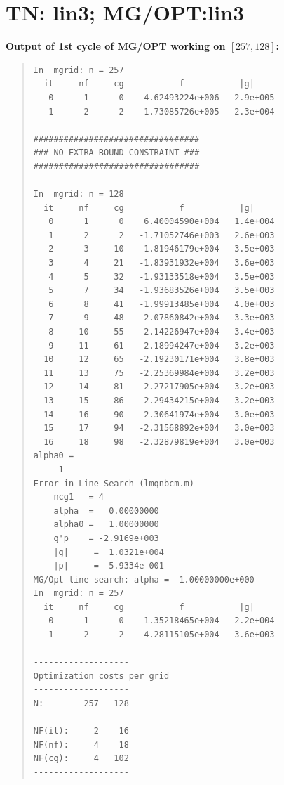 \documentclass[10pt]{article}
\begin{document}
\section{TN: lin3; MG/OPT:lin3}

\bf{Output of 1st cycle of MG/OPT working on $[257,128]$:}

\begin{quote}
\begin{verbatim}
In  mgrid: n = 257
  it     nf     cg           f           |g|
   0      1      0    4.62493224e+006   2.9e+005
   1      2      2    1.73085726e+005   2.3e+004
 
#################################
### NO EXTRA BOUND CONSTRAINT ###
#################################
 
In  mgrid: n = 128
  it     nf     cg           f           |g|
   0      1      0    6.40004590e+004   1.4e+004
   1      2      2   -1.71052746e+003   2.6e+003
   2      3     10   -1.81946179e+004   3.5e+003
   3      4     21   -1.83931932e+004   3.6e+003
   4      5     32   -1.93133518e+004   3.5e+003
   5      7     34   -1.93683526e+004   3.5e+003
   6      8     41   -1.99913485e+004   4.0e+003
   7      9     48   -2.07860842e+004   3.3e+003
   8     10     55   -2.14226947e+004   3.4e+003
   9     11     61   -2.18994247e+004   3.2e+003
  10     12     65   -2.19230171e+004   3.8e+003
  11     13     75   -2.25369984e+004   3.2e+003
  12     14     81   -2.27217905e+004   3.2e+003
  13     15     86   -2.29434215e+004   3.2e+003
  14     16     90   -2.30641974e+004   3.0e+003
  15     17     94   -2.31568892e+004   3.0e+003
  16     18     98   -2.32879819e+004   3.0e+003
alpha0 =
     1
Error in Line Search (lmqnbcm.m)
    ncg1   = 4
    alpha  =   0.00000000
    alpha0 =   1.00000000
    g'p    = -2.9169e+003
    |g|     =  1.0321e+004
    |p|     =  5.9334e-001
MG/Opt line search: alpha =  1.00000000e+000
In  mgrid: n = 257
  it     nf     cg           f           |g|
   0      1      0   -1.35218465e+004   2.2e+004
   1      2      2   -4.28115105e+004   3.6e+003

-------------------
Optimization costs per grid
-------------------
N:        257   128
-------------------
NF(it):     2    16
NF(nf):     4    18
NF(cg):     4   102
-------------------
\end{verbatim}
\end{quote}
\end{document}

